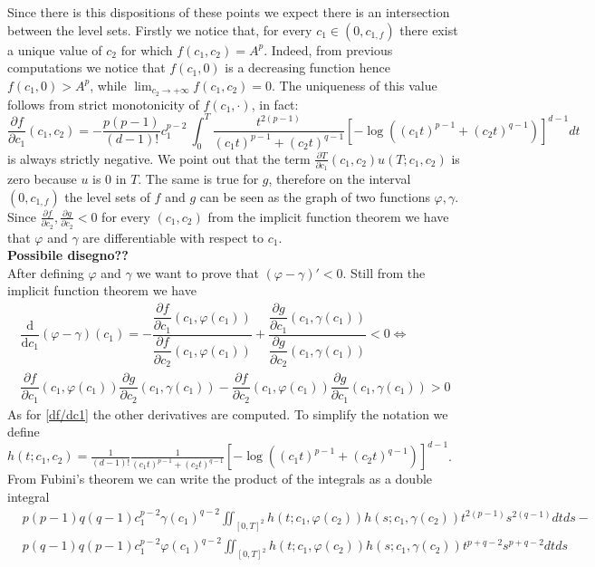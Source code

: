 \documentclass[corpo=11pt, stile=classica, tipotesi=custom,
greek, evenboxes, english]{toptesi}
\numberwithin{equation}{chapter}
\newcommand{\pfrac}[2]{\dfrac{\partial #1}{\partial #2}}
\begin{document}
Since there is this dispositions of these points we expect there is an intersection between the level sets. Firstly we notice that, for every $c_1 \in (0,c_{1,f})$ there exist a unique value of $c_2$ for which $f(c_1,c_2) = A^p$. Indeed, from previous computations we notice that $f(c_1,0)$ is a decreasing function hence $f(c_1,0) > A^p$, while $\lim_{c_2 \rightarrow +\infty} f(c_1,c_2) = 0$. The uniqueness of this value follows from strict monotonicity of $f(c_1,\cdot)$, in fact:
\begin{equation}\label{df/dc1}
	\pfrac{f}{c_1}(c_1,c_2) = -\dfrac{p(p-1)}{(d-1)!}c_1^{p-2}\ \int_0^T \dfrac{t^{2(p-1)}}{(c_1t)^{p-1}+(c_2t)^{q-1}} \left[ -\log\left((c_1t)^{p-1} + (c_2t)^{q-1}\right) \right]^{d-1}dt
\end{equation}
is always strictly negative. We point out that the term $\frac{\partial T}{\partial c_1}(c_1,c_2)u(T;c_1,c_2)$ is zero because $u$ is 0 in $T$. The same is true for $g$, therefore on the interval $(0,c_{1,f})$ the level sets of $f$ and $g$ can be seen as the graph of two functions $\varphi, \gamma$. Since $\frac{\partial f}{\partial c_2}, \frac{\partial g}{\partial c_2} < 0$ for every $(c_1,c_2)$ from the implicit function theorem we have that $\varphi$ and  $\gamma$ are differentiable with respect to $c_1$.\\
{\large{\textbf{Possibile disegno??}}}\\
After defining $\varphi$ and $\gamma$ we want to prove that $(\varphi-\gamma)' < 0$. Still from the implicit function theorem we have
\begin{equation*}
	\begin{split}
		\dfrac{\mathrm{d}}{\mathrm{d} c_1}(\varphi - \gamma)(c_1) = -\dfrac{\pfrac{f}{c_1}(c_1,\varphi(c_1))}{\pfrac{f}{c_2}(c_1,\varphi(c_1))}  + 
		\dfrac{\pfrac{g}{c_1}(c_1,\gamma(c_1))}{\pfrac{g}{c_2}(c_1,\gamma(c_1))} < 0 \iff \\
		\pfrac{f}{c_1}(c_1,\varphi(c_1)) \pfrac{g}{c_2}(c_1,\gamma(c_1)) - \pfrac{f}{c_2}(c_1,\varphi(c_1)) \pfrac{g}{c_1}(c_1,\gamma(c_1)) > 0
	\end{split}
\end{equation*}
As for \eqref{df/dc1} the other derivatives are computed. To simplify the notation we define $h(t;c_1,c_2) = \frac{1}{(d-1)!}\frac{1}{(c_1t)^{p-1}+(c_2t)^{q-1}}\left[ -\log\left((c_1t)^{p-1} + (c_2t)^{q-1}\right) \right]^{d-1}$. From Fubini's theorem we can write the product of the integrals as a double integral
\begin{equation*}
	\begin{split}
		&p(p-1)q(q-1)c_1^{p-2}\gamma(c_1)^{q-2} \iint_{[0,T]^2} h(t;c_1,\varphi(c_2)) h(s;c_1,\gamma(c_2)) t^{2(p-1)} s^{2(q-1)} dtds -\\ &p(q-1)q(p-1)c_1^{p-2}\varphi(c_1)^{q-2} \iint_{[0,T]^2} h(t;c_1,\varphi(c_2)) h(s;c_1,\gamma(c_2)) t^{p+q-2} s^{p+q-2} dtds
	\end{split}
\end{equation*}
\end{document}
